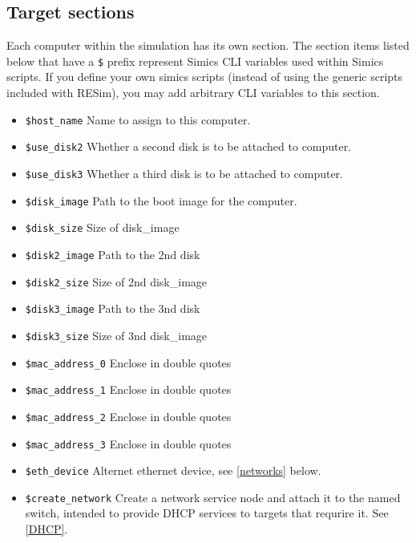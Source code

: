 \documentclass[titlepage]{article}
\begin{document}
\subsection{Target sections}
Each computer within the simulation has its own section. The section items listed below that 
have a {\tt \$} prefix represent Simics CLI variables used within Simics scripts.  If you define your own
simics scripts (instead of using the generic scripts included with RESim), you may add arbitrary CLI variables
to this section. 
\begin{itemize}
\item {\tt \$host\_name} Name to assign to this computer.
\item {\tt \$use\_disk2} Whether a second disk is to be attached to computer.
\item {\tt \$use\_disk3} Whether a third disk is to be attached to computer.
\item {\tt \$disk\_image} Path to the boot image for the computer.
\item {\tt \$disk\_size} Size of disk\_image
\item {\tt \$disk2\_image} Path to the 2nd disk
\item {\tt \$disk2\_size} Size of 2nd disk\_image
\item {\tt \$disk3\_image} Path to the 3nd disk
\item {\tt \$disk3\_size} Size of 3nd disk\_image
\item {\tt \$mac\_address\_0} Enclose in double quotes
\item {\tt \$mac\_address\_1} Enclose in double quotes
\item {\tt \$mac\_address\_2} Enclose in double quotes
\item {\tt \$mac\_address\_3} Enclose in double quotes
\item {\tt \$eth\_device} Alternet ethernet device, see \ref{networks} below.
\item {\tt \$create\_network} Create a network service node and attach it to the named switch, intended
to provide DHCP services to targets that requrire it. See \ref{DHCP}.


\end{itemize}
\end{document}
